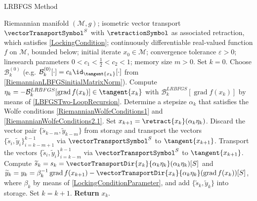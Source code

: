 \begin{algorithm}[H]
	\caption{LRBFGS Method} \label{LRBFGSMethod}
    \begin{algorithmic}[1]
        \State Riemannian manifold $(\mathcal{M}, g)$; isometric vector transport $\vectorTransportSymbol^S$ with $\retractionSymbol$ as associated retraction, which satisfies \cref{LockingCondition}; continuously differentiable real-valued function $f$ on $\mathcal{M}$, bounded below; initial iterate $x_0 \in \mathcal{M}$; convergence tolerance $\varepsilon > 0$; linesearch parameters $0 < c_1 < \frac{1}{2} < c_2 < 1$; memory size $m > 0$. Set $k = 0$.
            \State Choose $\mathcal{B}^{(0)}_k$ (e.g. $\mathcal{B}^{(0)}_k[\cdot] = c_k \id_{\tangent{x_k}}[\cdot]$ from \cref{RiemannianLBFGSinitialMatrixNorm}).
            \State Compute $\eta_k = - \mathcal{B}^{LRBFGS}_k[\operatorname{grad} f(x_k)] \in \tangent{x_k}$ with $\mathcal{B}^{LRBFGS}_k[\operatorname{grad} f(x_k)]$ 
            \StatexIndent[2] by means of \cref{LBFGSTwo-LoopRecursion}.
            \State Determine a stepsize $\alpha_k$ that satisfies the Wolfe conditions \cref{RiemannianWolfeConditions1} and \cref{RiemannianWolfeConditions2.1}.
			\State Set $x_{k+1} = \retract{x_k}(\alpha_k \eta_k)$.
                \State Discard the vector pair $\{ \widetilde{s}_{k−m}, \widetilde{y}_{k−m}\}$ from storage and transport the vectors $\{ \widetilde{s}_i, \widetilde{y}_i\}_{i=k-m+1}^{k-1}$ 
                \StatexIndent[2] via $\vectorTransportSymbol^S$ to $\tangent{x_{k+1}}$. 
			\Else 
				\State Transport the vectors $\{ \widetilde{s}_i, \widetilde{y}_i\}_{i=k-m}^{k-1}$ via $\vectorTransportSymbol^S$ to $\tangent{x_{k+1}}$.
            \EndIf 
            \State Compute $\widetilde{s}_k = s_k = \vectorTransportDir{x_k}{\alpha_k \eta_k}(\alpha_k \eta_k)[S]$ and $\widetilde{y}_k = y_k = \beta^{-1}_k \operatorname{grad} f(x_{k+1}) - \vectorTransportDir{x_k}{\alpha_k \eta_k}(\operatorname{grad} f(x_k))[S]$,
            \StatexIndent[2] where $\beta_k$ by means of \cref{LockingConditionParameter}, and add $\{\widetilde{s}_k, \widetilde{y}_k \}$ into storage.
            \State Set $k = k+1$.
        \EndWhile
        \State \textbf{Return} $x_k$.
    \end{algorithmic}
\end{algorithm}

